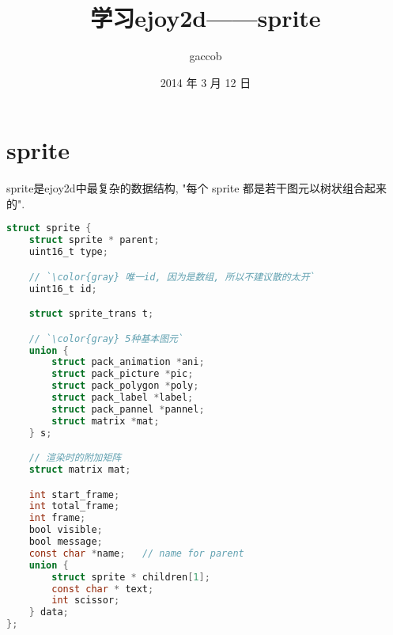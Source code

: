 

\title {\ZHH \huge 学习ejoy2d——sprite}
\author {\small gaccob}
\date {\small 2014 年 3 月 12 日}
\maketitle

\section {\ZHH sprite} {

    { sprite是ejoy2d中最复杂的数据结构, "每个 sprite 都是若干图元以树状组合起来的".}\par

\begin{lstlisting}[language=C]
struct sprite {
    struct sprite * parent;
    uint16_t type;

    // `\color{gray} 唯一id, 因为是数组, 所以不建议散的太开`
    uint16_t id;

    struct sprite_trans t;

    // `\color{gray} 5种基本图元`
    union {
        struct pack_animation *ani;
        struct pack_picture *pic;
        struct pack_polygon *poly;
        struct pack_label *label;
        struct pack_pannel *pannel;
        struct matrix *mat;
    } s;

    // 渲染时的附加矩阵
    struct matrix mat;

    int start_frame;
    int total_frame;
    int frame;
    bool visible;
    bool message;
    const char *name;	// name for parent
    union {
        struct sprite * children[1];
        const char * text;
        int scissor;
    } data;
};
\end{lstlisting}

}



